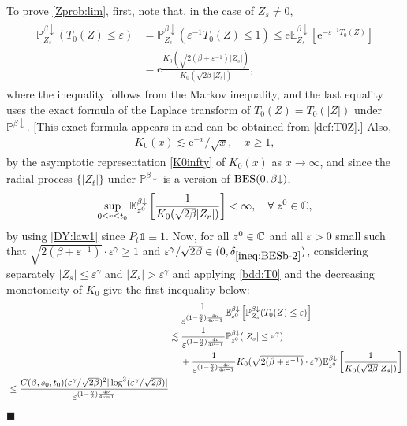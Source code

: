 \documentclass[12pt, twoside]{article}
\numberwithin{figure}{section}
\newcommand{\BES}{{\rm BES}}
\newcommand{\less}{\lesssim}
\newcommand{\e}{{\mathrm e}}
\newcommand{\1}{\mathds 1}
\newcommand{\vep}{{\varepsilon}}
\newcommand{\da}{{\downarrow}}
\renewcommand{\P}{{\mathbb P}}
\newcommand{\E}{{\mathbb E}}
\newcommand{\2}{{\mathbf 1}}
\renewenvironment{proof}[1][\proofname]{\noindent {\bfseries #1.}\;}{\hfill\ensuremath{\blacksquare}\\}
\newcommand{\deltaz}{\delta_{\ref{ineq:BESb-2}}}
\begin{document}
\begin{proof}[Proof of Proposition~\ref{prop:step1}]
To prove \eqref{Zprob:lim}, first, note that, in the case of $Z_s\neq 0$, 
\begin{align}\label{bdd:T0}
\begin{split}
\P^{\beta\da}_{Z_s}(T_0(Z)\leq \vep)&=\P^{\beta\da}_{Z_s}(\vep^{-1}T_0(Z)\leq 1)\leq \e\E^{\beta\da}_{Z_s}[\e^{-\vep^{-1}T_0(Z)}]\\
&=\e\frac{K_0(\sqrt{2(\beta+\vep^{-1})}|Z_s|)}{K_0(\sqrt{2\beta}|Z_s|)},
\end{split}
\end{align}
where the inequality follows from the Markov inequality, and the last equality uses the exact formula of the Laplace transform of $T_0(Z)=T_0(|Z|)$ under $\P^{\beta\da}$. [This exact formula appears in \cite[(2.9), p.884]{DY:Krein} and can be obtained from \eqref{def:T0Z}.] Also, 
\begin{align}\label{hKinfty:bdd}
K_0(x)\less   \e^{-x}/\sqrt{x}, \quad x\geq 1,
\end{align} 
by the asymptotic representation \eqref{K0infty} of $K_0(x)$ as $x\to\infty$, and since the radial process $\{|Z_t|\}$ under $\P^{\beta\da}$ is a version of $\BES (0,\beta\da)$, 
\begin{align}\label{supK}
\sup_{0\leq r\leq t_0}\E^{\beta\da}_{z^0}\left[\frac{1}{K_0(\sqrt{2\beta }|Z_r|)}\right]<\infty,\quad\forall \;z^0\in \Bbb C,
\end{align}
by using \eqref{DY:law1} since $P_t\1\equiv 1$. Now, for all $z^0\in \Bbb C$ and all $\vep>0$ small such that $\sqrt{2(\beta+\vep^{-1})}\cdot\vep^{\gamma}\geq 1$ and $\vep^\gamma/\sqrt{2\beta}\in (0,\deltaz )$, considering separately $|Z_s|\leq \vep^{\gamma}$ and $|Z_s|>\vep^\gamma$ 
and applying \eqref{bdd:T0} and the decreasing monotonicity of $K_0$ give the first inequality below:
\begin{align}
&\quad \;\frac{1}{\vep^{(1-\frac{\eta}{2})\frac{4\nu}{4\nu-1}}}\E_{z^0}^{\beta\da}\left[\P^{\beta\da}_{Z_s}(T_0(Z)\leq \vep)\right]\notag\\
&\less \frac{1}{\vep^{(1-\frac{\eta}{2})\frac{4\nu}{4\nu-1}}}\P^{\beta\da}_{z^0}(|Z_s|\leq \vep^\gamma)\notag\\
&\quad \;+\frac{1}{\vep^{(1-\frac{\eta}{2})\frac{4\nu}{4\nu-1}}}K_0(\sqrt{2(\beta+\vep^{-1})}\cdot\vep^{\gamma})
\E^{\beta\da}_{z^0}\left[\frac{1}{K_0(\sqrt{2\beta}|Z_s|)}\right]
\notag\\
\begin{split}
&\leq \frac{C(\beta,s_0,t_0)(\vep^{\gamma}/\sqrt{2\beta})^2|\log^3(\vep^\gamma/\sqrt{2\beta})|}{\vep^{(1-\frac{\eta}{2})\frac{4\nu}{4\nu-1}}}\\

\end{split}
\end{align}
\end{proof}
\end{document}
